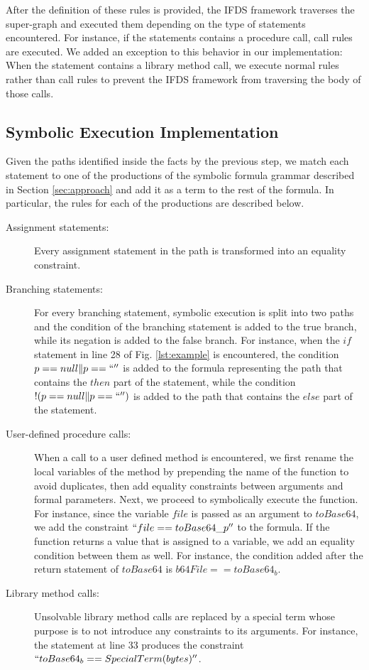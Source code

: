 After the definition of these rules is provided, the IFDS framework traverses the super-graph and executed them depending on the type of statements encountered. For instance, if the statements contains a procedure call, call rules are executed. We added an exception to this behavior in our implementation: When the statement contains a library method call, we execute normal rules rather than call rules to prevent the IFDS framework from traversing the body of those calls.

\subsection{Symbolic Execution Implementation}
Given the paths identified inside the facts by the previous step, we match each statement to one of the productions of the symbolic formula grammar described in Section \ref{sec:approach} and add it as a term to the rest of the formula. In particular, the rules for each of the productions are described below.
\begin{description}
\item[Assignment statements:] Every assignment statement in the path is transformed into an equality constraint. 
\item[Branching statements:] For every branching statement, symbolic execution is split into two paths and the condition of the branching statement is added to the true branch, while its negation is added to the false branch.
For instance, when the $if$ statement in line 28 of Fig. \ref{lst:example} is encountered, the condition $p==null \| p==``''$ is added to the formula representing the path that contains the $then$ part of the statement, while the condition $!(p==null \| p==``'')$ is added to the path that contains the $else$ part of the statement.
\item[User-defined procedure calls:] When a call to a user defined method is encountered, we first rename the local variables of the method by prepending the name of the function to avoid duplicates, then add equality constraints between arguments and formal parameters. Next, we proceed to symbolically execute the function. For instance, since the variable $file$ is passed as an argument to $toBase64$, we add the constraint $``file == toBase64\_p''$ to the formula. If the function returns a value that is assigned to a variable, we add an equality condition between them as well. For instance, the condition added after the return statement of $toBase64$ is $b64File==toBase64_b$.
\item[Library method calls:] Unsolvable library method calls are replaced by a special term whose purpose is to not introduce any constraints to its arguments. For instance, the statement at line 33 produces the constraint $``toBase64_b==SpecialTerm(bytes)''$.
\end{description}

